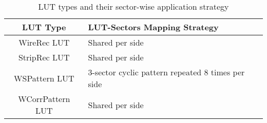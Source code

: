 \begin{table}[htbp]
  \centering
  \caption{LUT types and their sector-wise application strategy}
  \label{tab:LUT_with_sectors}
  \begin{tabular}{|c|p{8cm}|}
    \hline
    \textbf{LUT Type} & \textbf{LUT-Sectors Mapping Strategy} \\
    \hline
    WireRec LUT & Shared per side \\
    \hline
    StripRec LUT & Shared per side \\
    \hline
    WSPattern LUT & 3-sector cyclic pattern repeated 8 times per side \\
    \hline
    WCorrPattern LUT & Shared per side \\
    \hline
  \end{tabular}
\end{table}